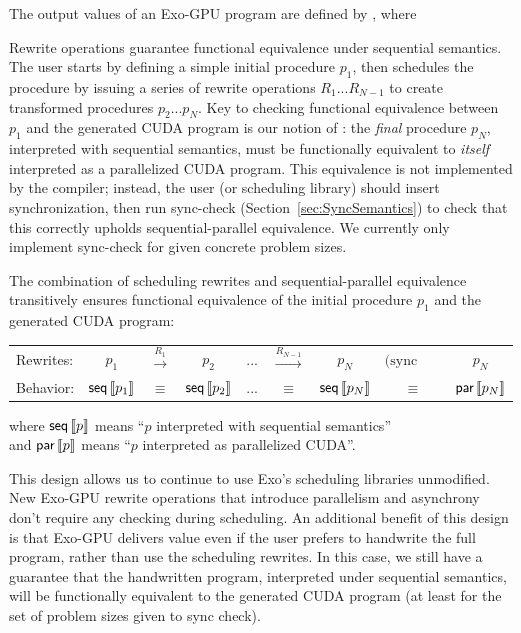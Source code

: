 
The output values of an Exo-GPU program are defined by , where
\begin{itemize}

\end{itemize}
Rewrite operations guarantee functional equivalence under sequential semantics.
The user starts by defining a simple initial procedure $p_1$, then schedules the procedure by issuing a series of rewrite operations $R_1 ... R_{N-1}$ to create transformed procedures $p_2 ... p_N$.
Key to checking functional equivalence between $p_1$ and the generated CUDA program is our notion of :
the \emph{final} procedure $p_N$, interpreted with sequential semantics, must be functionally equivalent to \emph{itself} interpreted as a parallelized CUDA program.
This equivalence is not implemented by the compiler;
instead, the user (or scheduling library) should insert synchronization, then run sync-check (Section~\ref{sec:SyncSemantics}) to check that this correctly upholds sequential-parallel equivalence.
We currently only implement sync-check for given concrete problem sizes.

The combination of scheduling rewrites and sequential-parallel equivalence transitively ensures functional equivalence of the initial procedure $p_1$ and the generated CUDA program:

\noindent
\begin{tabular}{l c c c c c c c c}
Rewrites: & $p_1$ & $\xrightarrow{R_1}$ & $p_2$ & ... & $\xrightarrow{R_{N-1}}$ & $p_N$ & \footnotesize $\text{(sync check)}$ & $p_N$ \\[2pt]
Behavior: & $\textsf{seq}\left\llbracket p_1\right\rrbracket$ & $\equiv$ & $\textsf{seq}\left\llbracket p_2\right\rrbracket$ & ... & $\equiv$ & $\textsf{seq}\left\llbracket p_N\right\rrbracket$ & $\equiv$ & $\textsf{par}\left\llbracket p_N\right\rrbracket$
\end{tabular}

\hphantom{xyzzy} where $\textsf{seq}\left\llbracket p\right\rrbracket$ means ``$p$ interpreted with sequential semantics''\\
\hphantom{xyzzy} and $\textsf{par}\left\llbracket p\right\rrbracket$ means ``$p$ interpreted as parallelized CUDA''.

This design allows us to continue to use Exo's scheduling libraries unmodified.
New Exo-GPU rewrite operations that introduce parallelism and asynchrony don't require any checking during scheduling.
An additional benefit of this design is that Exo-GPU delivers value even if the user prefers to handwrite the full program, rather than use the scheduling rewrites.
In this case, we still have a guarantee that the handwritten program, interpreted under sequential semantics, will be functionally equivalent to the generated CUDA program (at least for the set of problem sizes given to sync check).


